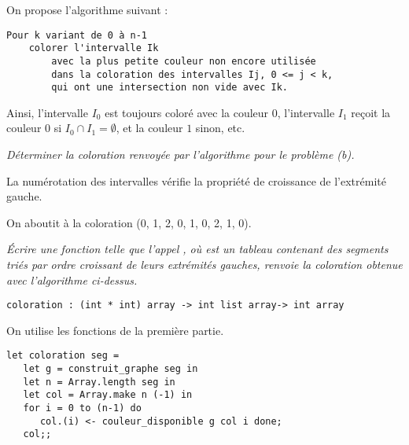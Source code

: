 On propose l'algorithme suivant :
\begin{lstlisting}
Pour k variant de 0 à n-1 
    colorer l'intervalle Ik 
        avec la plus petite couleur non encore utilisée 
        dans la coloration des intervalles Ij, 0 <= j < k,
        qui ont une intersection non vide avec Ik.
\end{lstlisting}
Ainsi, l'intervalle $I_0$ est toujours coloré avec la couleur 0,
l'intervalle $I_1$ reçoit la couleur $0$ si $I_0\cap I_1=\emptyset$,
et la couleur $1$ sinon, etc.
\begin{Exercise}[title=Un exemple]\it
Déterminer la coloration renvoyée par l'algorithme pour le problème (b).
\end{Exercise}  
\begin{Answer}

La numérotation des intervalles vérifie la propriété de croissance de l'extrémité gauche. 

On aboutit à la coloration (0, 1, 2, 0, 1, 0, 2, 1, 0).
\end{Answer}
\begin{Exercise}\it
Écrire une fonction  telle que l'appel , où  est un tableau contenant des segments triés par ordre croissant de leurs extrémités gauches, renvoie la coloration obtenue
avec l'algorithme ci-dessus.
\end{Exercise}  
\begin{lstlisting}
coloration : (int * int) array -> int list array-> int array
\end{lstlisting}
\begin{Answer}
On utilise les fonctions de la première partie.
\begin{lstlisting}
let coloration seg =
   let g = construit_graphe seg in
   let n = Array.length seg in
   let col = Array.make n (-1) in
   for i = 0 to (n-1) do 
      col.(i) <- couleur_disponible g col i done;
   col;;
\end{lstlisting} 
\end{Answer}
